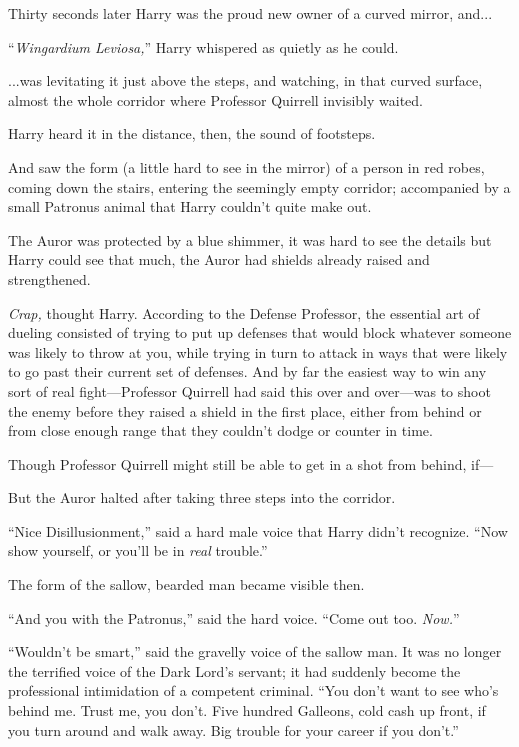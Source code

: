 Thirty seconds later Harry was the proud new owner of a curved mirror, and...

“\emph{Wingardium Leviosa,}” Harry whispered as quietly as he could.

...was levitating it just above the steps, and watching, in that curved surface, almost the whole corridor where Professor Quirrell invisibly waited.

Harry heard it in the distance, then, the sound of footsteps.

And saw the form (a little hard to see in the mirror) of a person in red robes, coming down the stairs, entering the seemingly empty corridor; accompanied by a small Patronus animal that Harry couldn’t quite make out.

The Auror was protected by a blue shimmer, it was hard to see the details but Harry could see that much, the Auror had shields already raised and strengthened.

\emph{Crap,} thought Harry. According to the Defense Professor, the essential art of dueling consisted of trying to put up defenses that would block whatever someone was likely to throw at you, while trying in turn to attack in ways that were likely to go past their current set of defenses. And by far the easiest way to win any sort of real fight—Professor Quirrell had said this over and over—was to shoot the enemy before they raised a shield in the first place, either from behind or from close enough range that they couldn’t dodge or counter in time.

Though Professor Quirrell might still be able to get in a shot from behind, if—

But the Auror halted after taking three steps into the corridor.

“Nice Disillusionment,” said a hard male voice that Harry didn’t recognize. “Now show yourself, or you’ll be in \emph{real} trouble.”

The form of the sallow, bearded man became visible then.

“And you with the Patronus,” said the hard voice. “Come out too. \emph{Now.}”

“Wouldn’t be smart,” said the gravelly voice of the sallow man. It was no longer the terrified voice of the Dark Lord’s servant; it had suddenly become the professional intimidation of a competent criminal. “You don’t want to see who’s behind me. Trust me, you don’t. Five hundred Galleons, cold cash up front, if you turn around and walk away. Big trouble for your career if you don’t.”


